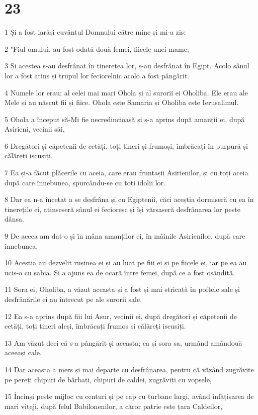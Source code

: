 \chapter{23}

\par 1 Și a fost iarăși cuvântul Domnului către mine și mi-a zis:
\par 2 "Fiul omului, au fost odată două femei, fiicele unei mame;
\par 3 Și acestea s-au desfrânat în tinerețea lor, s-au desfrânat în Egipt. Acolo sânul lor a fost atins și trupul lor feciorelnic acolo a fost pângărit.
\par 4 Numele lor erau: al celei mai mari Ohola și al surorii ei Oholiba. Ele erau ale Mele și au născut fii și fiice. Ohola este Samaria și Oholiba este Ierusalimul.
\par 5 Ohola a început să-Mi fie necredincioasă și s-a aprins după amanții ei, după Asirieni, vecinii săi,
\par 6 Dregători și căpetenii de cetăți, toți tineri și frumoși, îmbrăcați în purpură și călăreți iscusiți.
\par 7 Ea și-a făcut plăcerile cu aceia, care erau fruntașii Asirienilor, și cu toți aceia după care înnebunea, spurcându-se cu toți idolii lor.
\par 8 Dar ea n-a încetat a se desfrâna și cu Egiptenii, căci aceștia dormiseră cu ea în tinerețile ei, atinseseră sânul ei fecioresc și își vărsaseră desfrânarea lor peste dânsa.
\par 9 De aceea am dat-o și în mâna amanților ei, în mâinile Asirienilor, după care înnebunea.
\par 10 Aceștia au dezvelit rușinea ei și au luat pe fiii ei și pe fiicele ei, iar pe ea au ucis-o cu sabia. Și a ajuns ea de ocară între femei, după ce a fost osândită.
\par 11 Sora ei, Oholiba, a văzut aceasta și a fost și mai stricată în poftele sale și desfrânările ei au întrecut pe ale surorii sale.
\par 12 Ea s-a aprins după fiii lui Asur, vecinii ei, după dregători și căpetenii de cetăți, toți tineri aleși, îmbrăcați frumos și călăreți iscusiți.
\par 13 Am văzut deci că s-a pângărit și aceasta; ca și sora sa, urmând amândouă aceeași cale.
\par 14 Dar aceasta a mers și mai departe cu desfrânarea, pentru că văzând zugrăvite pe pereți chipuri de bărbați, chipuri de caldei, zugrăviți cu vopsele,
\par 15 Încinși peste mijloc cu centuri și pe cap cu turbane largi, având înfățișarea de mari viteji, după felul Babilonenilor, a căror patrie este țara Caldeilor,
